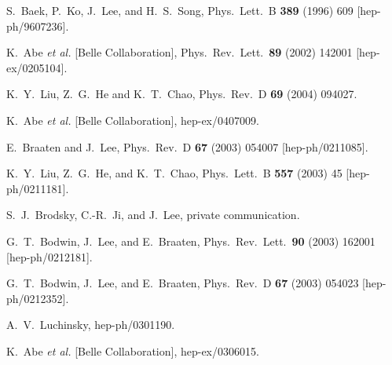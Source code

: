\begin{thebibliography}{999}
S.~Baek, P.~Ko, J.~Lee, and H.~S.~Song,
Phys.\ Lett.\ B {\bf 389} (1996) 609 
[hep-ph/9607236].

K.~Abe {\it et al.}  [Belle Collaboration],
Phys.\ Rev.\ Lett.\  {\bf 89} (2002) 142001
[hep-ex/0205104].

K.~Y.~Liu, Z.~G.~He and K.~T.~Chao,
Phys.\ Rev.\ D {\bf 69} (2004) 094027.

K.~Abe {\it et al.}  [Belle Collaboration],
hep-ex/0407009.

E.~Braaten and J.~Lee,
Phys.\ Rev.\ D {\bf 67} (2003) 054007 
[hep-ph/0211085].

K.~Y.~Liu, Z.~G.~He, and K.~T.~Chao,
Phys.\ Lett.\ B {\bf 557} (2003) 45 
[hep-ph/0211181].

S.~J.~Brodsky, C.-R.~Ji, and J.~Lee, private communication.

G.~T.~Bodwin, J.~Lee, and E.~Braaten,
Phys.\ Rev.\ Lett.\  {\bf 90} (2003) 162001 
[hep-ph/0212181].

G.~T.~Bodwin, J.~Lee, and E.~Braaten,
Phys.\ Rev.\ D {\bf 67} (2003) 054023 
[hep-ph/0212352].

A.~V.~Luchinsky,
hep-ph/0301190.

K.~Abe {\it et al.}  [Belle Collaboration],
hep-ex/0306015.


\end{thebibliography}
